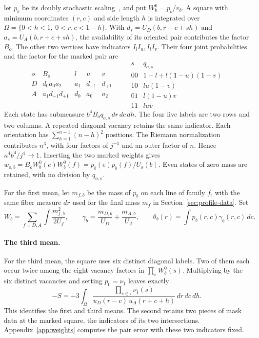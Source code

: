 let \(p_b\) be its doubly stochastic scaling~\cite{sk}, and put \(W_b^0=p_b/v_b\). A square with minimum
coordinates \((r,c)\) and side length \(h\) is integrated over \(\Omega=\{0<h<1,\ 0<r,c<1-h\}\). With
\(d_s=U_D(b,r-c+sh)\) and \(a_s=U_A(b,r+c+sh)\), the availability of its oriented pair contributes the
factor \(B_o\). The other two vertices have indicators \(I_l I_u,I_l I_v\). Their four joint
probabilities and the factor for the marked pair are \[
\begin{array}{c|cccc}
o&B_o&l&u&v\\\hline
 D&d_0a_0a_2&a_1&d_{-1}&d_{+1}\\
 A&a_1d_{-1}d_{+1}&d_0&a_0&a_2
\end{array}
\qquad
\begin{array}{c|c}
s&q_{o,s}\\\hline
00&1-l+l(1-u)(1-v)\\
10&lu(1-v)\\
01&l(1-u)v\\
11&luv
\end{array}
\] Each state has submeasure \(b^4 B_o q_{o,s}\,dr\,dc\,dh\). The four live labels are two rows and two
columns. A repeated diagonal vacancy retains the same indicator. Each orientation has
\(\sum_{h=1}^{n-1}(n-h)^2\) positions. The Riemann normalization contributes \(n^3\), with four factors
of \(j^{-1}\) and an outer factor of \(n\). Hence \(n^4 b^4/j^4\to1\). Inserting the two marked weights
gives \(w_{o,b}=B_oW_b^0(e)W_b^0(f)=p_b(e)p_b(f)/U_o(b)\). Even states of zero mass are retained, with no
division by \(q_{o,s}\).

For the first mean, let \(m_{f,b}\) be the mass of \(p_b\) on each line of family \(f\), with the same
fiber measure \(dr\) used for the final mass \(m_f\) in Section~\ref{sec:profile-data}. Set \[
 W_b=\sum_{f=D,A}\int\frac{m_{f,b}^2}{2U_f},\qquad
 \gamma_b=\frac{m_{D,b}}{U_D}+\frac{m_{A,b}}{U_A},\qquad
 \theta_b(r)=\int p_b(r,c)\gamma_b(r,c)\,dc .
\]   \paragraph{The third mean.} For
the third mean, the square uses six distinct diagonal labels. Two of them each occur twice among the
eight vacancy factors in \(\prod_s W_b^0(s)\). Multiplying by the six distinct vacancies and setting
\(p_0=\nu_1\) leaves exactly \begin{equation}\label{eq:S-def}
 -S=-3\int_\Omega
       \frac{\prod_{s\in\square}\nu_1(s)}
            {u_D(r-c)\,u_A(r+c+h)}\,dr\,dc\,dh .
\end{equation} This identifies the first and third means. The second retains two pieces of mask data at
the marked
square, the indicators of its two intersections. Appendix~\ref{app:weights} computes the pair error with
these two indicators fixed.
